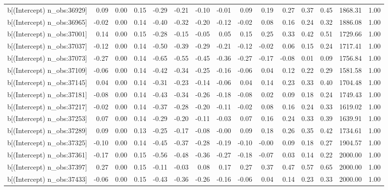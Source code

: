 \begin{table}[ht]
\begin{tabular}{rrrrrrrrrrrrrrr}
  b[(Intercept) n\_obs:36929] & 0.09 & 0.00 & 0.15 & -0.29 & -0.21 & -0.10 & -0.01 & 0.09 & 0.19 & 0.27 & 0.37 & 0.45 & 1868.31 & 1.00 \\ 
  b[(Intercept) n\_obs:36965] & -0.02 & 0.00 & 0.14 & -0.40 & -0.32 & -0.20 & -0.12 & -0.02 & 0.08 & 0.16 & 0.24 & 0.32 & 1886.08 & 1.00 \\ 
  b[(Intercept) n\_obs:37001] & 0.14 & 0.00 & 0.15 & -0.28 & -0.15 & -0.05 & 0.05 & 0.15 & 0.25 & 0.33 & 0.42 & 0.51 & 1729.66 & 1.00 \\ 
  b[(Intercept) n\_obs:37037] & -0.12 & 0.00 & 0.14 & -0.50 & -0.39 & -0.29 & -0.21 & -0.12 & -0.02 & 0.06 & 0.15 & 0.24 & 1717.41 & 1.00 \\ 
  b[(Intercept) n\_obs:37073] & -0.27 & 0.00 & 0.14 & -0.65 & -0.55 & -0.45 & -0.36 & -0.27 & -0.17 & -0.08 & 0.01 & 0.09 & 1756.84 & 1.00 \\ 
  b[(Intercept) n\_obs:37109] & -0.06 & 0.00 & 0.14 & -0.42 & -0.34 & -0.25 & -0.16 & -0.06 & 0.04 & 0.12 & 0.22 & 0.29 & 1581.58 & 1.00 \\ 
  b[(Intercept) n\_obs:37145] & 0.04 & 0.00 & 0.14 & -0.31 & -0.23 & -0.14 & -0.06 & 0.04 & 0.14 & 0.23 & 0.33 & 0.40 & 1704.48 & 1.00 \\ 
  b[(Intercept) n\_obs:37181] & -0.08 & 0.00 & 0.14 & -0.43 & -0.34 & -0.26 & -0.18 & -0.08 & 0.02 & 0.09 & 0.18 & 0.24 & 1749.43 & 1.00 \\ 
  b[(Intercept) n\_obs:37217] & -0.02 & 0.00 & 0.14 & -0.37 & -0.28 & -0.20 & -0.11 & -0.02 & 0.08 & 0.16 & 0.24 & 0.33 & 1619.02 & 1.00 \\ 
  b[(Intercept) n\_obs:37253] & 0.07 & 0.00 & 0.14 & -0.29 & -0.20 & -0.11 & -0.03 & 0.07 & 0.16 & 0.24 & 0.33 & 0.39 & 1639.91 & 1.00 \\ 
  b[(Intercept) n\_obs:37289] & 0.09 & 0.00 & 0.13 & -0.25 & -0.17 & -0.08 & -0.00 & 0.09 & 0.18 & 0.26 & 0.35 & 0.42 & 1734.61 & 1.00 \\ 
  b[(Intercept) n\_obs:37325] & -0.10 & 0.00 & 0.14 & -0.45 & -0.37 & -0.28 & -0.19 & -0.10 & -0.00 & 0.09 & 0.18 & 0.27 & 1904.57 & 1.00 \\ 
  b[(Intercept) n\_obs:37361] & -0.17 & 0.00 & 0.15 & -0.56 & -0.48 & -0.36 & -0.27 & -0.18 & -0.07 & 0.03 & 0.14 & 0.22 & 2000.00 & 1.00 \\ 
  b[(Intercept) n\_obs:37397] & 0.27 & 0.00 & 0.15 & -0.11 & -0.03 & 0.08 & 0.17 & 0.27 & 0.37 & 0.47 & 0.57 & 0.65 & 2000.00 & 1.00 \\ 
  b[(Intercept) n\_obs:37433] & -0.06 & 0.00 & 0.15 & -0.43 & -0.36 & -0.26 & -0.16 & -0.06 & 0.04 & 0.14 & 0.23 & 0.33 & 2000.00 & 1.00 \\ 

\end{tabular}
\end{table}
